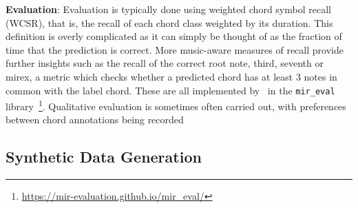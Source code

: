 \textbf{Evaluation}: Evaluation is typically done using weighted chord symbol recall (WCSR), that is, the recall of each chord class weighted by its duration. This definition is overly complicated as it can simply be thought of as the fraction of time that the prediction is correct. More music-aware measures of recall provide further insights such as the recall of the correct root note, third, seventh or mirex, a metric which checks whether a predicted chord has at least 3 notes in common with the label chord. These are all implemented by~\citet{mir_eval} in the \texttt{mir\_eval} library~\footnote{\url{https://mir-evaluation.github.io/mir_eval/}}. Qualitative evaluation is sometimes often carried out, with preferences between chord annotations being recorded





\subsection{Synthetic Data Generation}